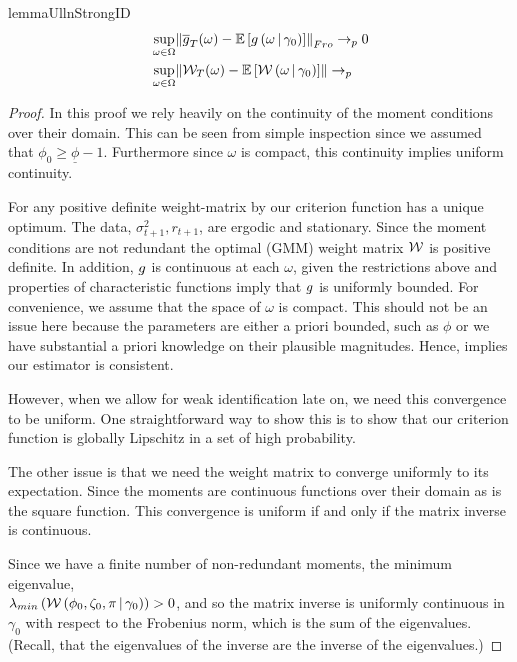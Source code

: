 \documentclass[11pt, letterpaper, twoside, final]{article}
\begin{document}
\begin{appendices}
\begin{restatable}{lemma}{UllnStrongID}
    \begin{align}
        &\sup_{\omega \in \Omega} \norm*{\sampmom(\omega) - \E\left[g\left(\omega \mvert
          \gamma_0\right)\right]}_{Fro} \pto 0 \\ 
        &\sup_{\omega \in \Omega} \norm{\W_{T}(\omega)-\E\left[\W\left(\omega \mvert \gamma_0\right)\right]} \pto 
    \end{align}

\end{restatable}

\begin{proof}

    In this proof we rely heavily on the continuity of the moment conditions over their domain. 
    This can be seen from simple inspection since we assumed that $\phi_0 \geq \underline{\phi} -1$.
    Furthermore since $\omega$ is compact, this continuity implies uniform continuity.
    
    For any positive definite weight-matrix by \textcite[Lemma 2.3]{newey1994large} our criterion function has
    a unique optimum.
    The data, $\sigma^2_{t+1}, r_{t+1}$, are ergodic and stationary.
    Since the moment conditions are not redundant the optimal (GMM) weight matrix $\mathcal{W}$ is positive definite. 
    In addition, $g$ is continuous at each $\omega$, given the restrictions above and properties of
    characteristic functions imply that $g$ is uniformly bounded. 
    For convenience, we assume that the space of $\omega$ is compact.
    This should not be an issue here because the parameters  are either a priori bounded, such as $\phi$ or we
    have substantial a priori knowledge on their plausible magnitudes.
    Hence, \textcite[Theroem 2.6]{newey1994large} implies our estimator is consistent.
    
    However, when we allow for weak identification late on, we need this convergence to be uniform. 
    One straightforward way to show this is to show that our criterion function is globally Lipschitz in a set of
    high probability. 
    
    The other issue is that we need the weight matrix to converge uniformly to its expectation.
    Since the moments are continuous functions over their domain as is the square function.
    This convergence is uniform if and only if the matrix inverse is continuous.
    
    Since we have a finite number of non-redundant moments, the minimum eigenvalue, \\
    $\lambda_{min}\left(\mathcal{W}\left(\phi_0, \zeta_0, \pi \,\middle\vert\, \gamma_0\right)\right) > 0$, and so the matrix inverse
    is uniformly continuous in $\gamma_0$ with respect to the Frobenius norm, which is the sum of the eigenvalues.
    (Recall, that the eigenvalues of the inverse are the inverse of the eigenvalues.)



\end{proof}
\end{appendices}
\end{document}
